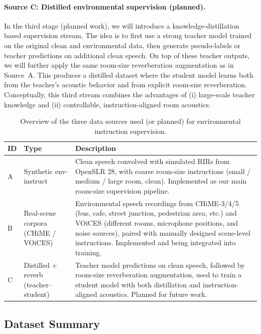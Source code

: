 \documentclass{article}
\begin{document}
\paragraph{Source C: Distilled environmental supervision (planned).}
In the third stage (planned work), we will introduce a knowledge-distillation based supervision stream. The idea is to first use a strong teacher model trained on the original clean and environmental data, then generate pseudo-labels or teacher predictions on additional clean speech. On top of these teacher outputs, we will further apply the same room-size reverberation augmentation as in Source~A. This produces a distilled dataset where the student model learns both from the teacher's acoustic behavior and from explicit room-size reverberation. Conceptually, this third stream combines the advantages of (i) large-scale teacher knowledge and (ii) controllable, instruction-aligned room acoustics.

\begin{table}[h]
\centering
\small
\begin{tabular}{lp{3cm}p{7cm}}
\toprule
ID & Type & Description \\
\midrule
A & Synthetic env-instruct &
Clean speech convolved with simulated RIRs from OpenSLR 28, with coarse room-size instructions (small / medium / large room, clean). Implemented as our main room-size supervision pipeline. \\
B & Real-scene corpora (CHiME / VOiCES) &
Environmental speech recordings from CHiME-3/4/5 (bus, cafe, street junction, pedestrian area, etc.) and VOiCES (different rooms, microphone positions, and noise sources), paired with manually designed scene-level instructions. Implemented and being integrated into training. \\
C & Distilled + reverb (teacher--student) &
Teacher model predictions on clean speech, followed by room-size reverberation augmentation, used to train a student model with both distillation and instruction-aligned acoustics. Planned for future work. \\
\bottomrule
\end{tabular}
\caption{Overview of the three data sources used (or planned) for environmental instruction supervision.}
\end{table}

\subsection{Dataset Summary}
\end{document}
